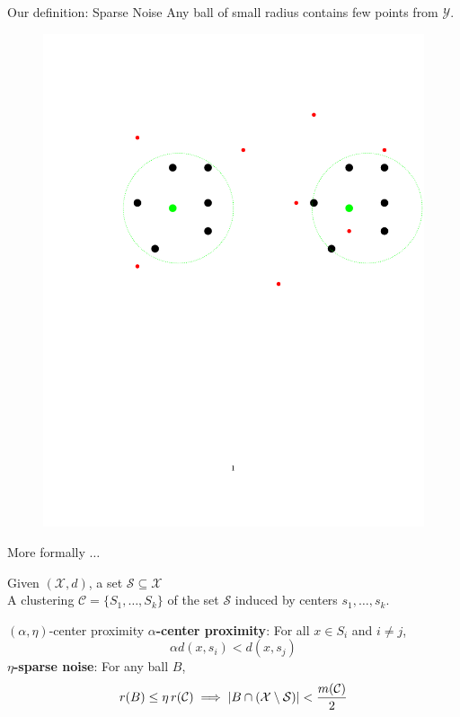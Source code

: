 \documentclass{beamer}
\newcommand{\mc}{\mathcal}
\begin{document}
\begin{frame}{Our definition: \alert {Sparse Noise}}
	\vspace{0.2cm}Any ball of small radius contains few points from $\mc Y$.
    \begin{figure}
	  \includegraphics[trim = 100 0 0 100, clip, width=0.8\linewidth]{figures/alphacpnoise.pdf}
   \end{figure}
\end{frame}

\begin{frame}{More formally $\ldots$}

	Given $(\mc X, d)$, a set $\mc S \subseteq \mc X$\\
	\vspace{0.5cm}A clustering $\mc C = \{S_1, \ldots, S_k\}$ of the set $\mc S$ induced by centers $s_1, \ldots, s_k$.

	\vspace{1cm}\begin{block}{$(\alpha, \eta)$-center proximity}
	\vspace{0.5cm} {\bf $\alpha$-center proximity}: For all $x \in S_i$ and $i\neq j$, $$\alpha d(x, s_i) < d(x, s_j)$$
	{\bf $\eta$-sparse noise}: For any ball $B$, 
	$$r(B)\leq \eta \thinspace r(\mc{C}) \implies |B\cap (\mc X\setminus \mc S)| < \frac{m(\mc C)}{2}$$
	\end{block}
\end{frame}
\end{document}
